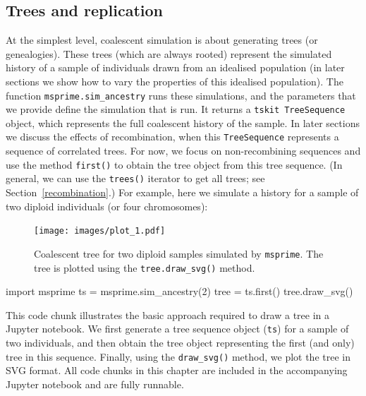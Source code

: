 \documentclass[graybox]{svmult}
\newcommand{\msprime}[0]{\texttt{msprime}}
\newcommand{\tskit}[0]{\texttt{tskit}}
\begin{document}
\subsection{Trees and replication}
At the simplest level, coalescent simulation is about generating trees (or genealogies).
These trees (which are always rooted) represent the simulated history of a sample of individuals
drawn from an idealised population (in later sections we show how to
vary the properties of this idealised population). The function
\texttt{msprime.sim\_ancestry} runs these simulations, and the parameters
that we provide define the simulation that is
run. It returns a \tskit\ \texttt{TreeSequence} object, which represents the
full coalescent history of the sample. In later sections we discuss the
effects of recombination, when this \texttt{TreeSequence} represents a
sequence of correlated trees. For now, we focus on non-recombining sequences and
use the method \texttt{first()} to obtain the
tree object from this tree sequence. (In general, we can use the \texttt{trees()} iterator
to get all trees; see Section~\ref{recombination}.)
For example, here we simulate a
history for a sample of two diploid individuals (or four chromosomes):

\begin{figure}[t]
\begin{center}
\texttt{[image: images/plot\_1.pdf]}
\end{center}
\caption{\label{fig-simple-tree} Coalescent tree for two diploid samples
simulated by \msprime.
The tree is plotted using the \texttt{tree.draw\_svg()} method.}
\end{figure}

\begin{pythoncode}
import msprime
ts = msprime.sim_ancestry(2)
tree = ts.first()
tree.draw_svg()
\end{pythoncode}

This code chunk illustrates the basic approach required to draw a tree
in a Jupyter notebook. We first generate a tree sequence object (\texttt{ts}) for a sample of two individuals,
and then obtain the tree object representing the first (and only)
tree in this sequence. Finally, using the \texttt{draw\_svg()} method, we plot
the tree in SVG format.
All code chunks in this chapter are included in the accompanying Jupyter
notebook and are fully runnable.
\end{document}
